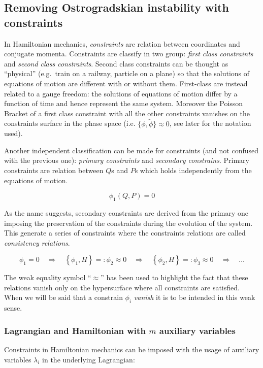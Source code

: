 \subsection{Removing Ostrogradskian instability with constraints}

In Hamiltonian mechanics, \emph{constraints} are relation between coordinates
and conjugate momenta. Constraints are classify in two group: \emph{first class
constraints} and \emph{second class constraints}. Second class constraints can
be thought as ``physical'' (e.g.\ train on a railway, particle on a plane) so
that the solutions of equations of motion are different with or without them.
First-class are instead related to a gauge freedom: the solutions of equations
of motion differ by a function of time and hence represent the same system.
Moreover the Poisson Bracket of a first class constraint with all the other
constraints vanishes on the constraints surface in the phase space (i.e.
$\{\phi, \tilde{\phi}\} \approx 0$, see later for the notation used).


Another independent classification can be made for constraints (and not confused
with the previous one): \emph{primary constraints} and \emph{secondary
constrains}.  Primary constraints are relation between $Q$s and $P$s which holds
independently from the equations of motion.

\begin{equation} \label{eq:constraint}
  \phi_1(Q, P) = 0
\end{equation}

As the name suggests, secondary constraints are derived from the primary one
imposing the preservation of the constraints during the evolution of the system.
This generate a series of constraints where the constraints relations are called
\emph{consistency relations}.

\begin{equation} \label{eq:consistency_relations}
  \phi_1 = 0 \quad \Rightarrow \quad
  \left\{ \phi_1 , H \right\} =: \phi_2 \approx 0 \quad \Rightarrow \quad
  \left\{ \phi_2 , H \right\} =: \phi_3 \approx 0 \quad \Rightarrow \quad
  \ldots
\end{equation}

The weak equality symbol ``$\approx$'' has been used to highlight the fact that
these relations vanish only on the hypersurface where all constraints are
satisfied. When we will be said that a constrain $\phi_i$ \emph{vanish} it is to
be intended in this weak sense.

\subsubsection{Lagrangian and Hamiltonian with $m$ auxiliary variables}
Constraints in Hamiltonian mechanics can be imposed with the usage of auxiliary
variables $\lambda_i$ in the underlying Lagrangian:

